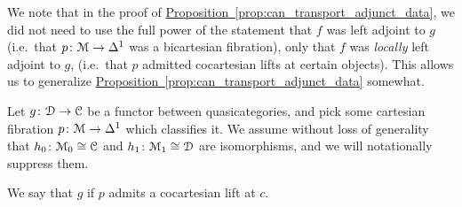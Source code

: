 \documentclass[main.tex]{subfiles}
\begin{document}

We note that in the proof of \hyperref[prop:can_transport_adjunct_data]{Proposition~\ref*{prop:can_transport_adjunct_data}}, we did not need to use the full power of the statement that $f$ was left adjoint to $g$ (i.e.\ that $p\colon \mathcal{M} \to \Delta^{1}$ was a bicartesian fibration), only that $f$ was \emph{locally} left adjoint to $g$, (i.e.\ that $p$ admitted cocartesian lifts at certain objects). This allows us to generalize \hyperref[prop:can_transport_adjunct_data]{Proposition~\ref*{prop:can_transport_adjunct_data}} somewhat.

\begin{definition}
  \label{def:partial_adjunction}
  Let $g\colon \mathcal{D} \to \mathcal{C}$ be a functor between quasicategories, and pick some cartesian fibration $p\colon \mathcal{M} \to \Delta^{1}$ which classifies it. We assume without loss of generality that $h_{0}\colon \mathcal{M}_{0} \cong \mathcal{C}$ and  $h_{1}\colon \mathcal{M}_{1} \cong \mathcal{D}$ are isomorphisms, and we will notationally suppress them.

  We say that $g$  if $p$ admits a cocartesian lift at $c$.
\end{definition}
\end{document}
